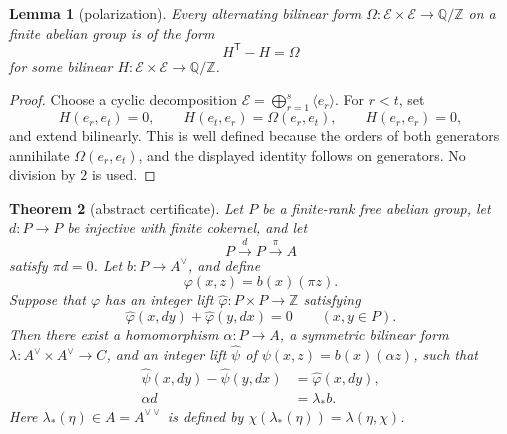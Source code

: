 \documentclass[11pt]{amsart}
\newtheorem{theorem}{Theorem}[section]
\newtheorem{lemma}[theorem]{Lemma}
\theoremstyle{definition}
\theoremstyle{remark}
\newcommand{\Z}{\mathbb Z}
\newcommand{\Q}{\mathbb Q}
\begin{document}
\begin{lemma}[polarization]\label{lem:polarization}
Every alternating bilinear form
\(\Omega:\mathcal E\times\mathcal E\to\Q/\Z\) on a finite abelian
group is of the form
\[
                              H^{\mathsf T}-H=\Omega
\]
for some bilinear \(H:\mathcal E\times\mathcal E\to\Q/\Z\).
\end{lemma}

\begin{proof}
Choose a cyclic decomposition
\(\mathcal E=\bigoplus_{r=1}^s\langle e_r\rangle\).  For \(r<t\), set
\[
 H(e_r,e_t)=0,\qquad
 H(e_t,e_r)=\Omega(e_r,e_t),\qquad H(e_r,e_r)=0,
\]
and extend bilinearly.  This is well defined because the orders of
both generators annihilate \(\Omega(e_r,e_t)\), and the displayed
identity follows on generators.  No division by \(2\) is used.
\end{proof}

\begin{theorem}[abstract certificate]\label{thm:abstract}
Let \(P\) be a finite-rank free abelian group, let
\(d:P\to P\) be injective with finite cokernel, and let
\[
                    P\xrightarrow{d}P\xrightarrow{\pi}A
\]
satisfy \(\pi d=0\).  Let \(b:P\to A^\vee\), and define
\[
                         \varphi(x,z)=b(x)(\pi z).
\]
Suppose that \(\varphi\) has an integer lift
\(\widehat\varphi:P\times P\to\Z\) satisfying
\begin{equation}\label{eq:lift-skew}
 \widehat\varphi(x,dy)+\widehat\varphi(y,dx)=0
 \qquad(x,y\in P).
\end{equation}
Then there exist a homomorphism \(\alpha:P\to A\), a symmetric
bilinear form \(\lambda:A^\vee\times A^\vee\to C\), and an integer
lift \(\widehat\psi\) of
\(\psi(x,z)=b(x)(\alpha z)\), such that
\begin{align}
 \widehat\psi(x,dy)-\widehat\psi(y,dx)
   &=\widehat\varphi(x,dy), \label{eq:abstract-psi}\\
 \alpha d&=\lambda_*b.     \label{eq:abstract-alpha}
\end{align}
Here \(\lambda_*(\eta)\in A=A^{\vee\vee}\) is defined by
\(\chi(\lambda_*(\eta))=\lambda(\eta,\chi)\).
\end{theorem}
\end{document}
